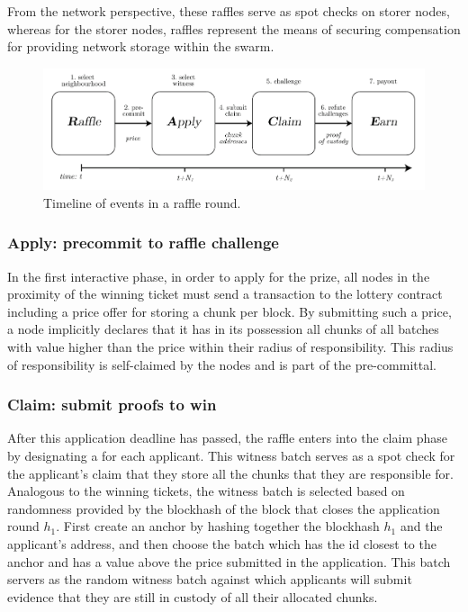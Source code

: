 From the network perspective, these raffles serve as spot checks on storer nodes, whereas for the storer nodes, raffles represent the means of securing compensation for providing network storage within the swarm. 


\begin{figure}[htbp]
  \centering
  \includegraphics[width=\textwidth]{fig/postage_race.pdf}
  \caption[Timeline of events in a raffle round \statusgreen]{Timeline of events in a raffle round.}
  \label{fig:raffle-timeline}
\end{figure}


\subsubsection{Apply: precommit to raffle challenge}

In the first interactive phase, in order to apply for the prize, all nodes in the proximity of the winning ticket must send a transaction to the lottery contract including a price offer for storing a chunk per block. By submitting such a price, a node implicitly declares that it has in its possession all chunks of all batches with value higher than the price within their radius of responsibility. This radius of responsibility is self-claimed by the nodes and is part of the pre-committal.


\subsubsection{Claim: submit proofs to win}

After this application deadline has passed, the raffle enters into the claim phase by designating a  for each applicant. This witness batch serves as a spot check for the applicant's claim that they store all the chunks that they are responsible for. Analogous to the winning tickets, the witness batch is selected based on randomness provided by the blockhash of the block that closes the application round $h_1$. First create an anchor by hashing together the blockhash $h_1$ and the applicant's address, and then  choose the batch which has the id closest to the anchor and has a value above the price submitted in the application. This batch servers as the random witness batch against which applicants will submit evidence that they are still in custody of all their allocated chunks. 

